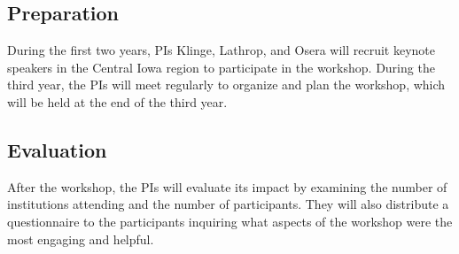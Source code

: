 \documentclass[11pt]{article}
\begin{document}
    \subsection{Preparation}
    During the first two years, PIs Klinge, Lathrop, and Osera will recruit keynote speakers in the Central Iowa region to participate in the workshop.
    During the third year, the PIs will meet regularly to organize and plan the workshop, which will be held at the end of the third year.

    \subsection{Evaluation}
    After the workshop, the PIs will evaluate its impact by examining the number of institutions attending and the number of participants.
    They will also distribute a questionnaire to the participants inquiring what aspects of the workshop were the most engaging and helpful.
\end{document}
